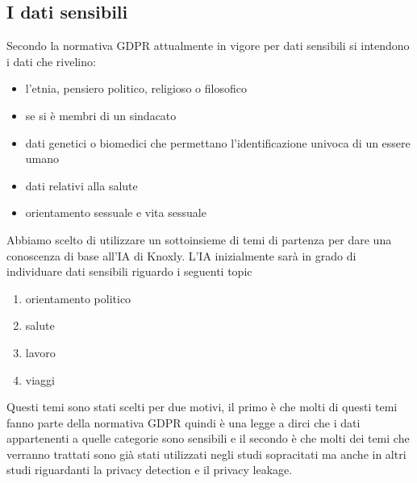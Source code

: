\subsection{I dati sensibili}
\label{ssec:sensitive_data}
Secondo la normativa GDPR attualmente in vigore per dati sensibili si intendono i dati che rivelino:
\begin{itemize}
    \item l'etnia, pensiero politico, religioso o filosofico
    \item se si è membri di un sindacato
    \item dati genetici o biomedici che permettano l'identificazione univoca di un essere umano
    \item dati relativi alla salute
    \item orientamento sessuale e vita sessuale
\end{itemize}
Abbiamo scelto di utilizzare un sottoinsieme di temi di partenza per dare una conoscenza di base all'IA di Knoxly. L'IA inizialmente sarà in grado di individuare dati sensibili riguardo i seguenti topic
\begin{enumerate}
    \item orientamento politico
    \item salute
    \item lavoro
    \item viaggi
\end{enumerate}
Questi temi sono stati scelti per due motivi, il primo è che molti di questi temi fanno parte della normativa GDPR quindi è una legge a dirci che i dati appartenenti a quelle categorie sono sensibili e il secondo è che molti dei temi che verranno trattati sono già stati utilizzati negli studi sopracitati ma anche in altri studi riguardanti la privacy detection e il privacy leakage.
